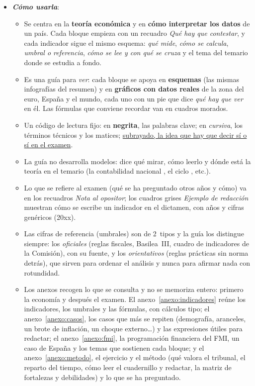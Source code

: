 \documentclass[11pt]{article}
\begin{document}
\begin{itemize}
\item \textbf{\emph{Cómo usarla}}:
  \begin{itemize}
  \item Se centra en la \textbf{teoría económica} y en \textbf{cómo interpretar los datos} de un país. Cada bloque empieza con un recuadro \emph{Qué hay que contestar}, y cada indicador sigue el mismo esquema: \emph{qué mide}, \emph{cómo se calcula}, \emph{umbral o referencia}, \emph{cómo se lee y con qué se cruza} y el tema del temario donde se estudia a fondo.
  \item Es una guía para \emph{ver}: cada bloque se apoya en \textbf{esquemas} (las mismas infografías del resumen) y en \textbf{gráficos con datos reales} de la zona del euro, España y el mundo, cada uno con un pie que dice \emph{qué hay que ver} en él. Las fórmulas que conviene recordar van en cuadros morados.
  \item Un código de lectura fijo: en \textbf{negrita}, las palabras clave; en \emph{cursiva}, los términos técnicos y los matices; \uline{subrayado, la idea que hay que decir sí o sí en el examen}.
  \item La guía no desarrolla modelos: dice qué mirar, cómo leerlo y dónde está la teoría en el temario (la contabilidad nacional , el ciclo , etc.).
  \item Lo que se refiere al examen (qué se ha preguntado otros años y cómo) va en los recuadros \emph{Nota al opositor}; los cuadros grises \emph{Ejemplo de redacción} muestran cómo se escribe un indicador en el dictamen, con años y cifras genéricos (20xx).
  \item Las cifras de referencia (umbrales) son de 2~tipos y la guía los distingue siempre: los \emph{oficiales} (reglas fiscales, Basilea~III, cuadro de indicadores de la Comisión), con su fuente, y los \emph{orientativos} (reglas prácticas sin norma detrás), que sirven para ordenar el análisis y nunca para afirmar nada con rotundidad.
  \item Los anexos recogen lo que se consulta y no se memoriza entero: primero la economía y después el examen. El anexo~\ref{anexo:indicadores} reúne los indicadores, los umbrales y las fórmulas, con cálculos tipo; el anexo~\ref{anexo:casos}, los casos que más se repiten (demografía, aranceles, un brote de inflación, un choque externo…) y las expresiones útiles para redactar; el anexo~\ref{anexo:fmi}, la programación financiera del FMI, un caso de España y los temas que sostienen cada bloque; y el anexo~\ref{anexo:metodo}, el ejercicio y el método (qué valora el tribunal, el reparto del tiempo, cómo leer el cuadernillo y redactar, la matriz de fortalezas y debilidades) y lo que se ha preguntado.

\end{itemize}
\end{itemize}
\end{document}
